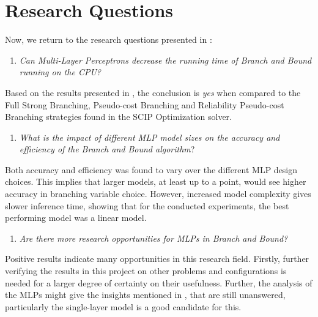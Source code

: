 \section{Research Questions}

Now, we return to the research questions presented in :
\begin{enumerate}[label=(\roman*)]
    \item \textit{Can Multi-Layer Perceptrons decrease the running time of Branch and Bound running on the \Gls{CPU}?}
\end{enumerate}
Based on the results presented in , the conclusion is \textit{yes} when compared to the Full Strong Branching, Pseudo-cost Branching and Reliability Pseudo-cost Branching strategies found in the SCIP Optimization solver. 
\begin{enumerate}[resume*]
    \item \textit{What is the impact of different \gls{MLP} model sizes on the accuracy and efficiency of the Branch and Bound algorithm}?
\end{enumerate}
Both accuracy and efficiency was found to vary over the different \gls{MLP} design choices. This implies that larger models, at least up to a point, would see higher accuracy in branching variable choice. However, increased model complexity gives slower inference time, showing that for the conducted experiments, the best performing model was a linear model.
\begin{enumerate}[resume*]
    \item \textit{Are there more research opportunities for \gls{MLP}s in Branch and Bound?}
\end{enumerate}
Positive results indicate many opportunities in this research field. Firstly, further verifying the results in this project on other problems and configurations is needed for a larger degree of certainty on their usefulness. Further, the analysis of the \gls{MLP}s might give the insights mentioned in \cite{lodi2017learning}, that are still unanswered, particularly the single-layer model is a good candidate for this.   